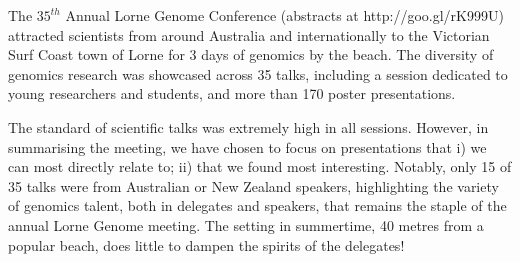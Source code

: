\documentclass[twocolumn]{bmcart}%
\begin{document}
\begin{frontmatter}
\begin{fmbox}
\begin{abstractbox}

\end{abstractbox}
%
\end{fmbox}%

\end{frontmatter}





The $35^{th}$ Annual Lorne Genome Conference (abstracts at http://goo.gl/rK999U) attracted scientists from around Australia and internationally to the Victorian Surf Coast town of Lorne for 3 days of genomics by the beach. The diversity of genomics research was showcased across 35 talks, including a session dedicated to young researchers and students, and more than 170 poster presentations.

The standard of scientific talks was extremely high in all sessions.  However, in summarising the meeting, we have chosen to focus on presentations that i) we can most directly relate to; ii) that we found most interesting.  Notably, only 15 of 35 talks were from Australian or New Zealand speakers, highlighting the variety of genomics talent, both in delegates and speakers, that remains the staple of the annual Lorne Genome meeting.  The setting in summertime, 40 metres from a popular beach, does little to dampen the spirits of the delegates!
\end{document}

